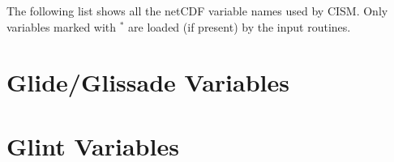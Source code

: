 \label{ug.sec.varlist}
The following list shows all the netCDF variable names used by CISM. 
Only variables marked with $^\ast$ are loaded (if present) by the input routines.
\section{Glide/Glissade Variables}

%

\clearpage  %
\section{Glint Variables}

